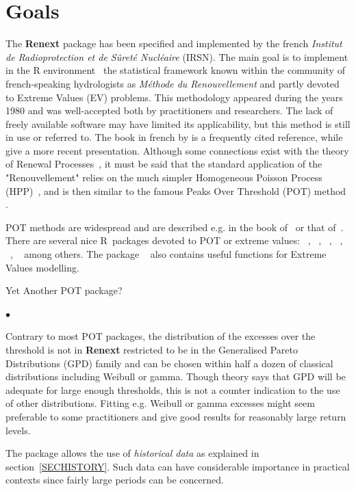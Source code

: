 \documentclass[a4paper]{report}
\newcommand{\pkg}[1]{\textbf{#1}}
\begin{document}
\section{Goals}
The \textbf{Renext} package has been specified and implemented by the
french \textit{Institut de Radioprotection et de S\^uret\'e
  Nucl\'eaire} (IRSN).  The main goal is to implement in the R
environment~\citep{RMANUAL} the statistical framework known within the
community of french-speaking hydrologists as \textit{M\'ethode du
  Renouvellement} and partly devoted to Extreme Values (EV) problems.  This
methodology appeared during the years 1980 and was well-accepted both
by practitioners and researchers. The lack of freely
available software may have limited its applicability, but this method is
still in use or referred to.  The book in french by \citet{MIQUELBOOK}
is a frequently cited reference, while~\cite{PARENTBOOK} give a more
recent presentation.  Although some connections exist with the theory
of Renewal Processes~\citep{COXRENEWAL}, it must be said that the
standard application of the "Renouvellement" relies on the much
simpler Homogeneous Poisson Process (HPP)~\citep{COXISHAM}, and is
then similar to the famous Peaks Over Threshold (POT) method
\citep{DAVSMITH}.

POT methods are widespread and are described e.g. in the book
of~\citet{COLES} or that of~\citet{EKM}. There are several nice
R~packages devoted to POT or extreme values:
\verb@extRemes@~\citep{PACKextRemes}, \verb@ismev@~\citep{PACKismev},
\verb@evd@~\citep{PACKevd}, \verb@POT@~\cite{PACKPOT}, \verb@evir@~\cite{PACKevir},
\verb@evdbayes@~\citep{PACKevdbayes} among others.  The package
\verb@nsRFA@~\citep{PACKnsRFA} also contains useful functions for
Extreme Values modelling.

\smallskip
Yet Another POT package?
\begin{list}{$\bullet$}{
    \setlength{\itemsep}{2pt} 
    \setlength{\topsep}{2pt} 
  } 
\item Contrary to most POT packages, the distribution of the excesses
  over the threshold is not in \pkg{Renext} restricted to be in the
  Generalised Pareto Distributions (GPD) family and can be chosen
  within half a dozen of classical distributions including Weibull or
  gamma. Though theory says that GPD will be adequate for large enough
  thresholds, this is not a counter indication to the use of other
  distributions.  Fitting e.g. Weibull or gamma excesses might seem
  preferable to some practitioners and give good results for
  reasonably large return levels. 
  
\item The package allows the use of \textit{historical data} as
  explained in section~\ref{SECHISTORY}. Such data can have
  considerable importance in practical contexts since fairly large
  periods can be concerned.
\end{list}
\end{document}

